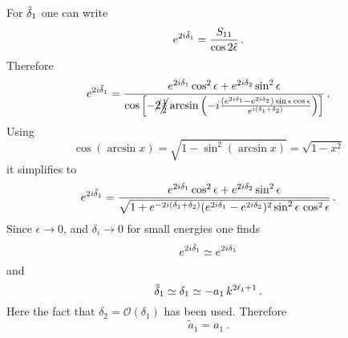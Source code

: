\documentclass[10pt,a4paper]{article}
\begin{document}
\begin{appendices}
		For $\tilde{\delta}_1$ one can write
		\begin{equation}
			e^{2i\tilde{\delta}_1} = \frac{S_{11}}{\cos2\tilde{\epsilon}}\,.
		\end{equation}
		Therefore
		\begin{equation}
			e^{2i\tilde{\delta}_1} =
			\frac{
				e^{2i\delta_1}\cos^2\epsilon
				+
				e^{2i\delta_2}\sin^2\epsilon
			 }{
			 \cos\left[-
			 \cancel{2}
			 \cancel{\frac{1}{2}}\arcsin
			 \left(
			 -i\frac{(e^{2i\delta_1}-e^{2i\delta_2})\sin\epsilon\cos\epsilon}{e^{i(\delta_1+\delta_2)}}
			 \right)
			 \right]
			 }\,.
		\end{equation}
		Using 
		\begin{equation}
			\cos (\arcsin x )=
			\sqrt{1-\sin^2(\arcsin x)}=\sqrt{1-x^2}
		\end{equation}
		it simplifies to
		\begin{equation}
			e^{2i\tilde{\delta}_1} =
			\frac{
				e^{2i\delta_1}\cos^2\epsilon
				+
				e^{2i\delta_2}\sin^2\epsilon
			}{
			\sqrt{
				1
				+
				e^{-2i(\delta_1+\delta_2)}
			(e^{2i\delta_1}-e^{2i\delta_2})^2\sin^2\epsilon\,\cos^2\epsilon}
			}\,.
		\end{equation}
		Since $\epsilon\rightarrow0$, and $\delta_i\rightarrow 0$ for small energies one finds
		\begin{equation}
			e^{2i\tilde{\delta}_1} \simeq
				e^{2i\delta_1}
		\end{equation}
		and 
		\begin{equation}
			\tilde{\delta}_1 \simeq \delta_1 \simeq -a_1\,k^{2\ell_1+1}\,.
		\end{equation}
		Here the fact that $\delta_2 = \mathcal{O}(\delta_1)$ has been used.
		Therefore
		\begin{equation}
			\tilde{a}_1 = a_1\,.
		\end{equation}
		

\end{appendices}
\end{document}
